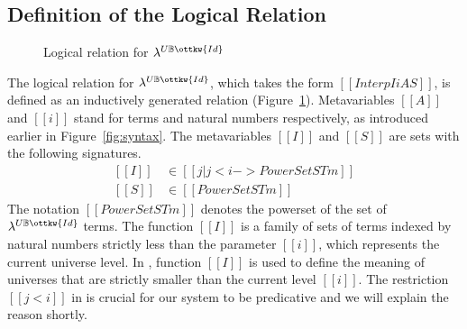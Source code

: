 \documentclass[acmsmall,screen=true,
\ifpublic review=false\else,review=true\fi
  ,anonymous=\ifanonymous true\else false\fi]{acmart}
\newcommand{\lang}{$\lambda^{U\mathbb{B}\ottkw{Id}}$\xspace}
\newcommand{\scw}[1]{}
\newcommand{\yl}[1]{}
\begin{document}
\subsection{Definition of the Logical Relation}
\label{sec:logreldep}
\begin{figure}[h]
\caption{Logical relation for \lang}
\label{fig:logrel}
\end{figure}
The logical relation for \lang{}, which takes the form $[[Interp I i A
S]]$, is defined as an inductively generated relation (Figure~\ref{fig:logrel}).
Metavariables $[[A]]$ and $[[i]]$ stand for terms and natural
numbers respectively, as introduced earlier in
Figure~\ref{fig:syntax}.
The metavariables $[[I]]$ and $[[S]]$ are
sets with the following signatures.
\begin{equation*}
  \begin{split}
    [[I]] &\in [[ { j | j < i  } ->  PowerSet STm ]] \\
    [[S]] &\in [[PowerSet STm]]
  \end{split}
\end{equation*}
The notation $[[PowerSet STm]]$ denotes the powerset of the set of
\lang{} terms.
The function $[[I]]$ is a family of sets of terms indexed by
natural numbers strictly less than the parameter $[[i]]$, which
represents the current universe level.  In , function
$[[I]]$ is used to define the meaning of
universes that are strictly smaller than the current level $[[i]]$. The
restriction $[[j < i]]$ in  is crucial for our system to
be predicative and we will explain the reason shortly.
\end{document}
